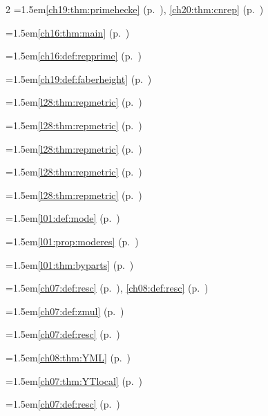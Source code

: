 \begin{multicols}{2}
\hangindent=1.5em\quad \ref{ch19:thm:primehecke} (p.~\pageref{ch19:thm:primehecke}), \ref{ch20:thm:cnrep} (p.~\pageref{ch20:thm:cnrep})\par
\hangindent=1.5em\quad \ref{ch16:thm:main} (p.~\pageref{ch16:thm:main})\par
\hangindent=1.5em\quad \ref{ch16:def:repprime} (p.~\pageref{ch16:def:repprime})\par
\hangindent=1.5em\quad \ref{ch19:def:faberheight} (p.~\pageref{ch19:def:faberheight})\par
\hangindent=1.5em\quad \ref{l28:thm:repmetric} (p.~\pageref{l28:thm:repmetric})\par
\hangindent=1.5em\quad \ref{l28:thm:repmetric} (p.~\pageref{l28:thm:repmetric})\par
\hangindent=1.5em\quad \ref{l28:thm:repmetric} (p.~\pageref{l28:thm:repmetric})\par
\hangindent=1.5em\quad \ref{l28:thm:repmetric} (p.~\pageref{l28:thm:repmetric})\par
\hangindent=1.5em\quad \ref{l28:thm:repmetric} (p.~\pageref{l28:thm:repmetric})\par
\hangindent=1.5em\quad \ref{l01:def:mode} (p.~\pageref{l01:def:mode})\par
\hangindent=1.5em\quad \ref{l01:prop:moderes} (p.~\pageref{l01:prop:moderes})\par
\hangindent=1.5em\quad \ref{l01:thm:byparts} (p.~\pageref{l01:thm:byparts})\par
\hangindent=1.5em\quad \ref{ch07:def:resc} (p.~\pageref{ch07:def:resc}), \ref{ch08:def:resc} (p.~\pageref{ch08:def:resc})\par
\hangindent=1.5em\quad \ref{ch07:def:zmul} (p.~\pageref{ch07:def:zmul})\par
\hangindent=1.5em\quad \ref{ch07:def:resc} (p.~\pageref{ch07:def:resc})\par
\hangindent=1.5em\quad \ref{ch08:thm:YML} (p.~\pageref{ch08:thm:YML})\par
\hangindent=1.5em\quad \ref{ch07:thm:YTlocal} (p.~\pageref{ch07:thm:YTlocal})\par
\hangindent=1.5em\quad \ref{ch07:def:resc} (p.~\pageref{ch07:def:resc})\par

\end{multicols}
